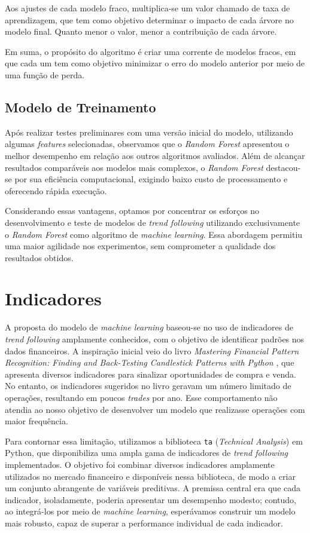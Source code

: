 \documentclass{article}
\begin{document}
Aos ajustes de cada modelo fraco, multiplica-se um valor chamado de taxa de aprendizagem, que tem como objetivo determinar o impacto de cada árvore no modelo final. Quanto menor o valor, menor a contribuição de cada árvore.

Em suma, o propósito do algoritmo é criar uma corrente de modelos fracos, em que cada um tem como objetivo minimizar o erro do modelo anterior por meio de uma função de perda.

\subsection{Modelo de Treinamento}

Após realizar testes preliminares com uma versão inicial do modelo, utilizando algumas \textit{features} selecionadas, observamos que o \textit{Random Forest} apresentou o melhor desempenho em relação aos outros algoritmos avaliados. Além de alcançar resultados comparáveis aos modelos mais complexos, o \textit{Random Forest} destacou-se por sua eficiência computacional, exigindo baixo custo de processamento e oferecendo rápida execução. 

Considerando essas vantagens, optamos por concentrar os esforços no desenvolvimento e teste de modelos de \textit{trend following} utilizando exclusivamente o \textit{Random Forest} como algoritmo de \textit{machine learning}. Essa abordagem permitiu uma maior agilidade nos experimentos, sem comprometer a qualidade dos resultados obtidos.

\newpage

\section{Indicadores}
A proposta do modelo de \textit{machine learning} baseou-se no uso de indicadores de \textit{trend following} amplamente conhecidos, com o objetivo de identificar padrões nos dados financeiros. A inspiração inicial veio do livro \textit{Mastering Financial Pattern Recognition: Finding and Back-Testing Candlestick Patterns with Python} \cite{Kaabar}, que apresenta diversos indicadores para sinalizar oportunidades de compra e venda. No entanto, os indicadores sugeridos no livro geravam um número limitado de operações, resultando em poucos \textit{trades} por ano. Esse comportamento não atendia ao nosso objetivo de desenvolver um modelo que realizasse operações com maior frequência.

Para contornar essa limitação, utilizamos a biblioteca \texttt{ta} (\textit{Technical Analysis}) em Python, que disponibiliza uma ampla gama de indicadores de \textit{trend following} implementados. O objetivo foi combinar diversos indicadores amplamente utilizados no mercado financeiro e disponíveis nessa biblioteca, de modo a criar um conjunto abrangente de variáveis preditivas. A premissa central era que cada indicador, isoladamente, poderia apresentar um desempenho modesto; contudo, ao integrá-los por meio de \textit{machine learning}, esperávamos construir um modelo mais robusto, capaz de superar a performance individual de cada indicador. 
\end{document}
